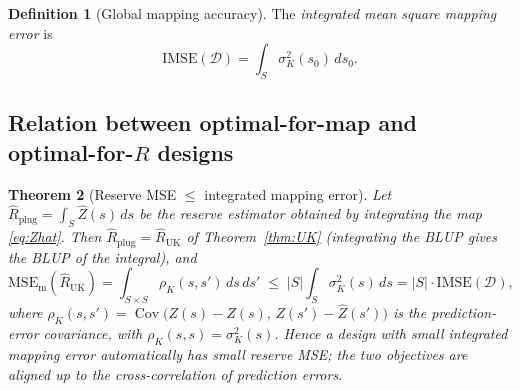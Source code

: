 \documentclass{amsart}
\newtheorem{theorem}{Theorem}
\theoremstyle{definition}
\newtheorem{definition}[theorem]{Definition}
\newcommand{\Cov}{\operatorname{Cov}}
\newcommand{\Rhat}{\widehat R}
\newcommand{\Zhat}{\widehat Z}
\begin{document}
\begin{definition}[Global mapping accuracy]
The \emph{integrated mean square mapping error} is
\begin{equation}\label{eq:IMSE}
\mathrm{IMSE}(\mathcal D)=\int_S \sigma_K^2(s_0)\,ds_0 .
\end{equation}
\end{definition}

\subsection{Relation between optimal-for-map and optimal-for-$R$ designs}

\begin{theorem}[Reserve MSE $\le$ integrated mapping
error]\label{thm:link}
Let $\Rhat_{\mathrm{plug}}=\int_S\Zhat(s)\,ds$ be the reserve estimator
obtained by integrating the map \eqref{eq:Zhat}. Then
$\Rhat_{\mathrm{plug}}=\Rhat_{\mathrm{UK}}$ of Theorem~\ref{thm:UK}
(integrating the BLUP gives the BLUP of the integral), and
\begin{equation}\label{eq:linkineq}
\mathrm{MSE}_{\mathrm m}(\Rhat_{\mathrm{UK}})
=\int_{S\times S}\rho_K(s,s')\,ds\,ds'
\;\le\;|S|\int_S\sigma_K^2(s)\,ds=|S|\cdot\mathrm{IMSE}(\mathcal D),
\end{equation}
where $\rho_K(s,s')=\Cov\big(Z(s)-\Zhat(s),\,Z(s')-\Zhat(s')\big)$ is the
prediction-error covariance, with $\rho_K(s,s)=\sigma_K^2(s)$. Hence a
design with small integrated mapping error automatically has small reserve
MSE; the two objectives are aligned up to the cross-correlation of
prediction errors.
\end{theorem}
\end{document}
